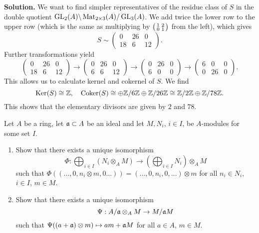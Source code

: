 \documentclass[a4paper,11pt]{article}
\begin{document}
\textbf{Solution.}  
We want to find simpler representatives of the residue class of $S$ in the double
quotient $\operatorname{GL}_2(A) \backslash \operatorname{Mat}_{2 \times 3}(A) / \operatorname{GL}_3(A)$. We add twice
the lower row to the upper row (which is the same as multiplying by $\big(\begin{smallmatrix} 1 & 2\\ 0 & 1 \end{smallmatrix}\big)$ 
from the left), which gives
\begin{equation*}
    S \sim \begin{pmatrix}
        0 & 26 & 0 \\
        18 & 6 & 12
    \end{pmatrix}.
\end{equation*}
Further transformations yield
\begin{equation*}
    \begin{pmatrix}
        0 & 26 & 0 \\
        18 & 6 & 12
    \end{pmatrix}
    \to 
    \begin{pmatrix}
        0 & 26 & 0 \\
        6 & 6 & 12
    \end{pmatrix}
    \to
    \begin{pmatrix}
        0 & 26 & 0 \\
        6 & 0 & 0
    \end{pmatrix}
    \to 
\begin{pmatrix}
        6 & 0 & 0 \\
        0 & 26 & 0
    \end{pmatrix}.
\end{equation*}
This allows us to calculate kernel and cokernel of $S$. We find
\begin{equation*}
    \operatorname{Ker}(S) \cong \mathbb{Z}, \quad \operatorname{Coker}(S) \cong \oplus \mathbb{Z}/6\mathbb{Z} \oplus \mathbb{Z}/26\mathbb{Z} \cong
    \mathbb{Z}/2\mathbb{Z} \oplus \mathbb{Z}/78\mathbb{Z}.
\end{equation*}
This shows that the elementary divisors are given by $2$ and $78$. 

Let $A$ be a ring, let $\mathfrak{a} \subset A$ be an ideal and let $M, N_i$, $i \in I$, be $A$-modules for some set $I$. 
\begin{enumerate}
    \item Show that there exists a unique isomorphism
        \begin{equation*}
            \Phi: \bigoplus_{i \in I} (N_i \otimes_A M) \to \left( \bigoplus_{i
                \in I} N_i \right ) \otimes_A M
        \end{equation*}
        such that $\Phi((\dots,0, n_i \otimes m, 0 \dots)) = (\dots, 0, n_i, 0,\dots) \otimes m$ for all $n_i \in N_i$, $i \in I$, $m \in M$. 
    \item Show that there exists a unique isomorphism
        \begin{equation*}
            \Psi: A / \mathfrak{a} \otimes_A M \to M/\mathfrak{a} M
        \end{equation*}
        such that $\Psi((a + \mathfrak{a}) \otimes m) \mapsto am + \mathfrak{a} M$ for all 
        $a \in A$, $m \in M$. 
\end{enumerate}
\end{document}
